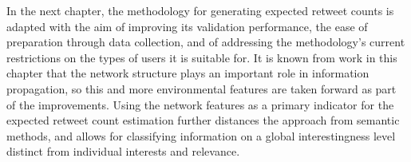 In the next chapter, the methodology for generating expected retweet counts is adapted with the aim of improving its validation performance, the ease of preparation through data collection, and of addressing the methodology's current restrictions on the types of users it is suitable for. It is known from work in this chapter that the network structure plays an important role in information propagation, so this and more environmental features are taken forward as part of the improvements. Using the network features as a primary indicator for the expected retweet count estimation further distances the approach from semantic methods, and allows for classifying information on a global interestingness level distinct from individual interests and relevance.
